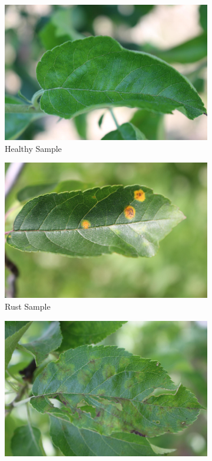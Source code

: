 \documentclass[10pt,twocolumn,letterpaper]{article}
\begin{document}
\begin{figure}[htb]
\begin{center}
\begin{subfigure}[b]{0.246\linewidth}
\centering
\includegraphics[width=\linewidth]{images/healthy.jpg}
\caption{Healthy Sample}\label{healthyFig}
\end{subfigure}
\begin{subfigure}[b]{0.246\linewidth}
\centering
\includegraphics[width=\linewidth]{images/rust.jpg}
\caption{Rust Sample}\label{rustFig}
\end{subfigure}
\begin{subfigure}[b]{0.246\linewidth}
\centering
\includegraphics[width=\linewidth]{images/scab.jpg}

\end{subfigure}
\end{center}
\end{figure}
\end{document}
